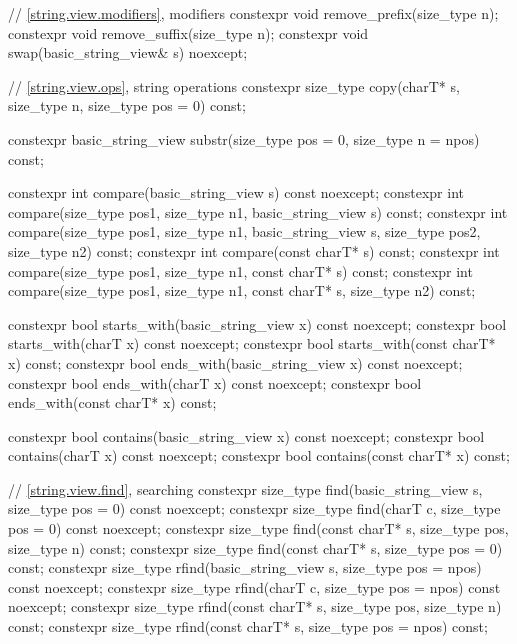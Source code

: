 \begin{codeblock}
{{    // \ref{string.view.modifiers}, modifiers
    constexpr void remove_prefix(size_type n);
    constexpr void remove_suffix(size_type n);
    constexpr void swap(basic_string_view& s) noexcept;

    // \ref{string.view.ops}, string operations
    constexpr size_type copy(charT* s, size_type n, size_type pos = 0) const;

    constexpr basic_string_view substr(size_type pos = 0, size_type n = npos) const;

    constexpr int compare(basic_string_view s) const noexcept;
    constexpr int compare(size_type pos1, size_type n1, basic_string_view s) const;
    constexpr int compare(size_type pos1, size_type n1, basic_string_view s,
                          size_type pos2, size_type n2) const;
    constexpr int compare(const charT* s) const;
    constexpr int compare(size_type pos1, size_type n1, const charT* s) const;
    constexpr int compare(size_type pos1, size_type n1, const charT* s, size_type n2) const;

    constexpr bool starts_with(basic_string_view x) const noexcept;
    constexpr bool starts_with(charT x) const noexcept;
    constexpr bool starts_with(const charT* x) const;
    constexpr bool ends_with(basic_string_view x) const noexcept;
    constexpr bool ends_with(charT x) const noexcept;
    constexpr bool ends_with(const charT* x) const;

    constexpr bool contains(basic_string_view x) const noexcept;
    constexpr bool contains(charT x) const noexcept;
    constexpr bool contains(const charT* x) const;

    // \ref{string.view.find}, searching
    constexpr size_type find(basic_string_view s, size_type pos = 0) const noexcept;
    constexpr size_type find(charT c, size_type pos = 0) const noexcept;
    constexpr size_type find(const charT* s, size_type pos, size_type n) const;
    constexpr size_type find(const charT* s, size_type pos = 0) const;
    constexpr size_type rfind(basic_string_view s, size_type pos = npos) const noexcept;
    constexpr size_type rfind(charT c, size_type pos = npos) const noexcept;
    constexpr size_type rfind(const charT* s, size_type pos, size_type n) const;
    constexpr size_type rfind(const charT* s, size_type pos = npos) const;

}}
\end{codeblock}

